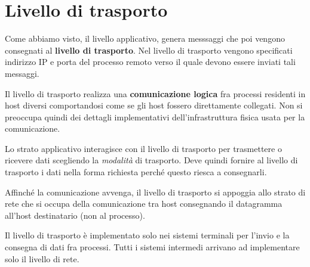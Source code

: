 \chapter{Livello di trasporto}
Come abbiamo visto, il livello applicativo, genera messsaggi che poi 
vengono consegnati al \textbf{livello di trasporto}. Nel livello di 
trasporto vengono specificati indirizzo IP e porta del processo remoto 
verso il quale devono essere inviati tali messaggi.

Il livello di trasporto realizza una \textbf{comunicazione logica} fra 
processi residenti in host diversi comportandosi come se gli host 
fossero direttamente collegati. Non si preoccupa quindi dei dettagli 
implementativi dell'infrastruttura fisica usata per la comunicazione.

Lo strato applicativo interagisce con il livello di trasporto per 
trasmettere o ricevere dati scegliendo la \emph{modalità} di trasporto.
Deve quindi fornire al livello di trasporto i dati nella forma 
richiesta perché questo riesca a consegnarli.

Affinché la comunicazione avvenga, il livello di trasporto si appoggia 
allo strato di rete che si occupa della comunicazione tra host 
consegnando il datagramma all'host destinatario (non al processo).

Il livello di trasporto è implementato solo nei sistemi terminali per 
l'invio e la consegna di dati fra processi. Tutti i sistemi intermedi 
arrivano ad implementare solo il livello di rete.

